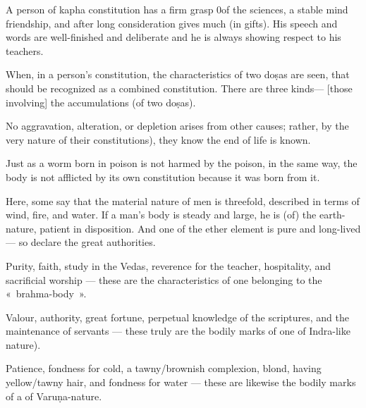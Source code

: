 \begin{translation}
\begin{tt}
\item[75]

A person of kapha constitution has a firm  grasp 0of the sciences, a stable mind friendship, and after long consideration gives much (in gifts). His speech and words are well-finished and deliberate and  he is always showing respect  to his teachers.

\item[76]

\item[77]

When, in a person’s constitution, the characteristics of two doṣas are seen, that should be recognized as a combined constitution. There are three kinds— [those involving] the accumulations (of two doṣas).

\item[78]

No aggravation, alteration, or depletion arises  from other causes; rather, by the very nature of their constitutions), they know the end of life is known.

\item[79]

Just as a worm  born in poison is not harmed by the poison, in the same way, the body is not afflicted by its own constitution because it was born from it.

\item[80]

Here, some say that the material nature of men is threefold, described in terms of wind, fire, and water. If a man’s body is steady and large, he is (of) the earth-nature, patient in disposition. And one of the ether element is pure and long-lived — so declare the great authorities.

\item[81]

Purity, faith, study in the Vedas, reverence for the teacher, hospitality, and sacrificial worship — these are the characteristics of one belonging to the « brahma-body ».

\item[82]

Valour, authority, great fortune, perpetual knowledge of the scriptures, and the maintenance of servants  — these truly  are the bodily marks of one of Indra-like nature).

\item[83]

Patience, fondness for cold, a tawny/brownish complexion, blond, having yellow/tawny hair, and fondness for water — these are likewise the bodily marks of a of Varuṇa-nature.


\end{tt}
\end{translation}
